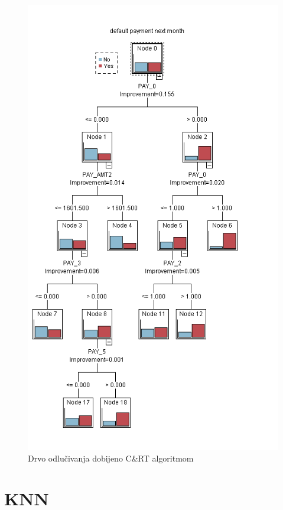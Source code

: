 \documentclass[a4paper]{article}
\begin{document}
\begin{figure}[h!]
\begin{center}
    \includegraphics[scale=0.55]{crtDrvo.png}
    \caption{Drvo odlučivanja dobijeno C\&RT algoritmom}
    \label{fig:CRTDrvo}
\end{center}
\end{figure}
 

\clearpage
\section{KNN}	
\label{sec:KNN}
\end{document}
